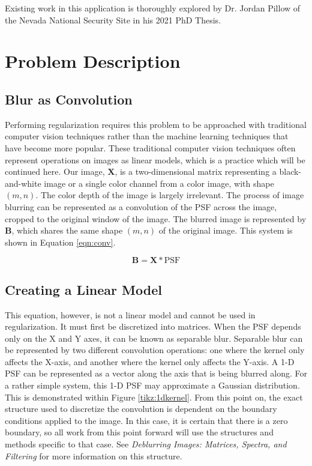 \documentclass[letterpaper, 10pt, titlepage, twocolumn]{article}
\begin{document}
Existing work in this application is thoroughly explored by Dr. Jordan Pillow of the Nevada National Security Site in his 2021 PhD Thesis. \cite{pillow_bayesian_2021} %

\section*{Problem Description}
\subsection*{Blur as Convolution}
Performing regularization requires this problem to be approached with traditional computer vision techniques rather than the machine learning techniques that have become more popular. These traditional computer vision techniques often represent operations on images as linear models, which is a practice which will be continued here. Our image, $\mathbf{X}$, is a two-dimensional matrix representing a black-and-white image or a single color channel from a color image, with shape $(m,n)$. The color depth of the image is largely irrelevant. The process of image blurring can be represented as a convolution of the PSF across the image, cropped to the original window of the image. The blurred image is represented by $\mathbf{B}$, which shares the same shape $(m,n)$ of the original image. This system is shown in Equation \eqref{eqn:conv}.

\begin{equation}
    \label{eqn:conv}
    \mathbf{B}=\mathbf{X} \ast \textrm{PSF}
\end{equation}

\subsection*{Creating a Linear Model}
This equation, however, is not a linear model and cannot be used in regularization. It must first be discretized into matrices. When the PSF depends only on the X and Y axes, it can be known as separable blur. Separable blur can be represented by two different convolution operations: one where the kernel only affects the X-axis, and another where the kernel only affects the Y-axis. A 1-D PSF can be represented as a vector along the axis that is being blurred along. For a rather simple system, this 1-D PSF may approximate a Gaussian distribution. This is demonstrated within Figure \ref{tikz:1dkernel}. From this point on, the exact structure used to discretize the convolution is dependent on the boundary conditions applied to the image. In this case, it is certain that there is a zero boundary, so all work from this point forward will use the structures and methods specific to that case. See \emph{Deblurring Images: Matrices, Spectra, and Filtering} \cite{hansen_deblurring_2006} for more information on this structure.
\end{document}
